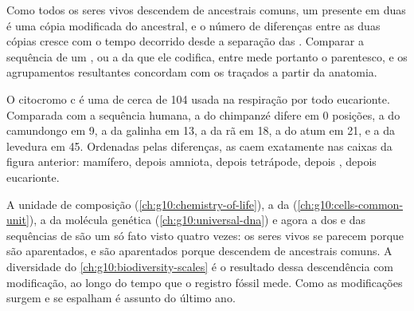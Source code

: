 \begin{proposition}\label{prop:g10:common-ancestry:molecular}
Como todos os seres vivos descendem de ancestrais comuns, um 
presente em duas  é uma cópia modificada do  ancestral, e o
número de diferenças entre as duas cópias cresce com o tempo decorrido
desde a separação das . Comparar a sequência de um , ou a
da  que ele codifica, entre  mede portanto o
parentesco, e os agrupamentos resultantes concordam com os traçados a
partir da anatomia.
\end{proposition}
\admitted

\begin{example}[O citocromo c]\label{ex:g10:common-ancestry:cytochrome}
O citocromo c é uma  de cerca de 104  usada na
respiração por todo eucarionte. Comparada com a sequência humana, a do
chimpanzé difere em 0 posições, a do camundongo em 9, a da galinha em
13, a da rã em 18, a do atum em 21, e a da levedura em 45. Ordenadas
pelas diferenças, as  caem exatamente nas caixas da figura
anterior: mamífero, depois amniota, depois tetrápode, depois
, depois eucarionte.
\end{example}

\begin{remark}\label{rem:g10:common-ancestry:unity}
A unidade de composição (\cref{ch:g10:chemistry-of-life}), a da 
(\cref{ch:g10:cells-common-unit}), a da molécula genética
(\cref{ch:g10:universal-dna}) e agora a dos  e das
sequências de  são um só fato visto quatro vezes: os seres vivos
se parecem porque são aparentados, e são aparentados porque descendem
de ancestrais comuns. A diversidade do
\cref{ch:g10:biodiversity-scales} é o resultado dessa descendência com
modificação, ao longo do tempo que o registro fóssil mede. Como as
modificações surgem e se espalham é assunto do último ano.
\end{remark}

